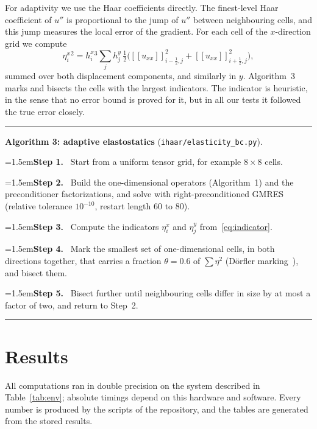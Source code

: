 \documentclass[smallextended,envcountsame]{svjour3}
\newcommand{\step}[1]{\par\noindent\hangindent=1.5em\hangafter=1\textbf{Step #1.}\ }
\begin{document}
For adaptivity we use the Haar coefficients directly. The finest-level Haar coefficient of $u''$ is
proportional to the jump of $u''$ between neighbouring cells, and this jump measures the local error of
the gradient. For each cell of the $x$-direction grid we compute
\begin{equation}\label{eq:indicator}
\eta^x_i{}^2=h^x_i{}^3\sum_jh^y_j\,\tfrac12\Big([\![u_{xx}]\!]_{i-\frac12,j}^2+[\![u_{xx}]\!]_{i+\frac12,j}^2\Big),
\end{equation}
summed over both displacement components, and similarly in $y$. Algorithm~3 marks and bisects the cells
with the largest indicators. The indicator is heuristic, in the sense that no error bound is proved for it,
but in all our tests it followed the true error closely.

\begin{algorithm}[t]\small\hrule\smallskip
\noindent\textbf{Algorithm 3: adaptive elastostatics} (\texttt{ihaar/elasticity\_bc.py}).
\step{1} Start from a uniform tensor grid, for example $8\times8$ cells.
\step{2} Build the one-dimensional operators (Algorithm~1) and the preconditioner factorizations, and solve with right-preconditioned GMRES (relative tolerance $10^{-10}$, restart length 60 to 80).
\step{3} Compute the indicators $\eta^x_i$ and $\eta^y_j$ from~\eqref{eq:indicator}.
\step{4} Mark the smallest set of one-dimensional cells, in both directions together, that carries a fraction $\theta=0.6$ of $\sum\eta^2$ (D\"orfler marking~\cite{dorfler1996convergent}), and bisect them.
\step{5} Bisect further until neighbouring cells differ in size by at most a factor of two, and return to Step~2.
\smallskip\hrule
\end{algorithm}

\section{Results}\label{sec:results}
All computations ran in double precision on the system described in Table~\ref{tab:env}; absolute
timings depend on this hardware and software. Every number is produced by the scripts of the repository,
and the tables are generated from the stored results.
\end{document}
